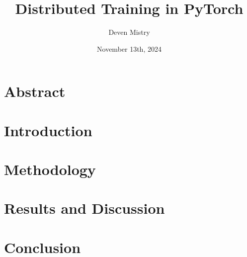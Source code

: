 \documentclass{IEEEtran}
\title{Distributed Training in PyTorch}
\author{Deven Mistry}
\date{November 13th, 2024}
\begin{document}
\maketitle

\section*{Abstract}

\section*{Introduction}

\section*{Methodology}

\section*{Results and Discussion}

\section*{Conclusion}
\end{document}

